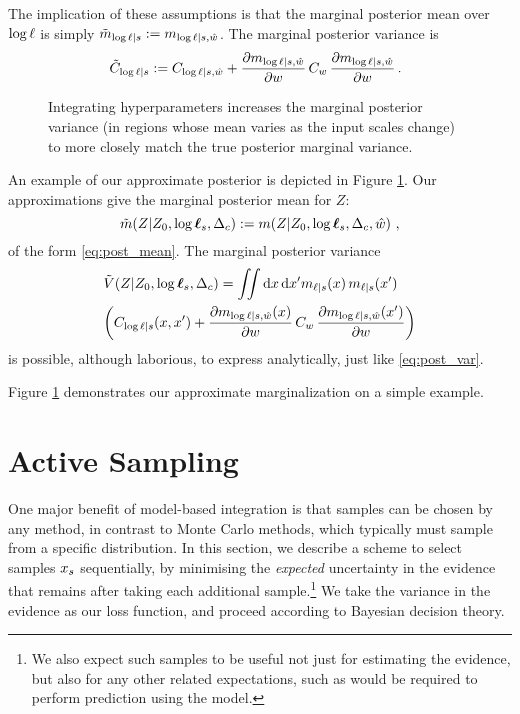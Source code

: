 \documentclass{article}
\begin{document}
The implication of these assumptions is that the marginal posterior mean over $\tr$ is simply
$
\tilde{m}_{\tr|s} \deq m_{\tr|s,\hat{w}}
$.   
The marginal posterior variance is 
\begin{equation}
\hspace{-0.2cm}
\tilde{C}_{\tr|s} 
\deq C_{\tr|s,\hat{w}}
+ 
\pderiv{m_{\tr|s,\hat{w}}}{w}
\,C_w\,
\pderiv{m_{\tr|s,\hat{w}}}{w}\,.
\end{equation}
%
\begin{figure}
\centering
{}
\caption{Integrating hyperparameters increases the marginal posterior variance (in regions whose mean varies as the input scales change) to more closely match the true posterior marginal variance.}
\label{fig:integrate_hypers}
\end{figure}
%
An example of our approximate posterior is depicted in Figure  \ref{fig:integrate_hypers}.
Our approximations give the marginal posterior mean for $Z$:
\begin{equation}
\tilde{m}(\If|Z_0,\tvr_s,\Delta_c) \deq \mean{\If}{Z_0,\tvr_s,\Delta_c, \hat{w}}\,,
\end{equation}
of the form \eqref{eq:post_mean}. The marginal posterior variance
\begin{align}
& \tilde{V}(\If|Z_0,\tvr_s,\Delta_c)=
 \iint  \ud \lfv\, \ud\lfv' m_{\lfn|s}(\lfv)\, m_{\lfn|s}(\lfv')\nonumber\\
&  
\biggl(C_{\tr|s}(\lfv,\lfv') + 
\pderiv{m_{\tr|s,\hat{w}}(x)}{w}
\,C_w\,
\pderiv{m_{\tr|s,\hat{w}}(x')}{w}
\biggr)
\end{align}
is possible, although laborious, to express analytically, just like \eqref{eq:post_var}. 

Figure \ref{fig:integrate_hypers} demonstrates our approximate marginalization on a simple example.

\section{Active Sampling}\label{sec:BBQ}

One major benefit of model-based integration is that samples can be chosen by any method, in contrast to Monte Carlo methods, which typically must sample from a specific distribution.  In this section, we describe a scheme to select samples $\lfv_s$ sequentially, by minimising the \textit{expected} uncertainty in the evidence that remains after taking each additional sample.\footnote{We also expect such samples to be useful not just for estimating the evidence, but also for any other related expectations, such as would be required to perform prediction using the model.} We take the variance in the evidence as our loss function, and proceed according to Bayesian decision theory.
\end{document}

